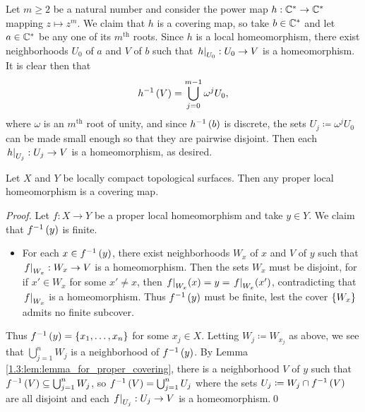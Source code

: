 \documentclass[../Moduli_Spaces_of_Riemann_Surfaces.tex]{subfiles}
\begin{document}
    \begin{example}\label{1.3:exa:covering_map_power}
        Let $m\geq2$ be a natural number and consider the power map $h:\mathbb{C}^\ast\to\mathbb{C}^\ast$ mapping $z\mapsto z^m$. We claim that $h$ is a covering map, so take $b\in\mathbb{C}^\ast$ and let $a\in\mathbb{C}^\ast$ be any one of its $m^\textrm{th}$ roots. Since $h$ is a local homeomorphism, there exist neighborhoods $U_0$ of $a$ and $V$ of $b$ such that $\left.h\right|_{U_0}:U_0\to V$ is a homeomorphism. It is clear then that
        \vspace{-0.05in}
        \begin{equation*}
            h^{-1}\left(V\right)=\bigcup_{j=0}^{m-1}\omega^jU_0,
        \end{equation*}
        where $\omega$ is an $m^\textrm{th}$ root of unity, and since $h^{-1}\left(b\right)$ is discrete, the sets $U_j\coloneqq\omega^jU_0$ can be made small enough so that they are pairwise disjoint. Then each $\left.h\right|_{U_j}:U_j\to V$ is a homeomorphism, as desired.\exqed
    \end{example}
    \begin{proposition}
        Let $X$ and $Y$ be locally compact topological surfaces. Then any proper local homeomorphism is a covering map.
    \end{proposition}
    \begin{proof}
        Let $f:X\to Y$ be a proper local homeomorphism and take $y\in Y$. We claim that $f^{-1}\left(y\right)$ is finite.
        \begin{itemize}
            \item For each $x\in f^{-1}\left(y\right)$, there exist neighborhoods $W_x$ of $x$ and $V$ of $y$ such that $\left.f\right|_{W_x}:W_x\to V$ is a homeomorphism. Then the sets $W_x$ must be disjoint, for if $x'\in W_x$ for some $x'\neq x$, then $\left.f\right|_{W_x}\!\left(x\right)=y=\left.f\right|_{W_x}\!\left(x'\right)$, contradicting that $\left.f\right|_{W_x}$ is a homeomorphism. Thus $f^{-1}\left(y\right)$ must be finite, lest the cover $\left\{W_x\right\}$ admits no finite subcover.
        \end{itemize}
        Thus $f^{-1}\left(y\right)=\left\{x_1,\dots,x_n\right\}$ for some $x_j\in X$. Letting $W_j\coloneqq W_{x_j}$ as above, we see that $\bigcup_{j=1}^{n}W_j$ is a neighborhood of $f^{-1}\left(y\right)$. By Lemma \ref{1.3:lem:lemma_for_proper_covering}, there is a neighborhood $V$ of $y$ such that $f^{-1}\left(V\right)\subseteq\bigcup_{j=1}^{n}W_j$, so $f^{-1}\left(V\right)=\bigcup_{j=1}^{n}U_j$ where the sets $U_j\coloneqq W_j\cap f^{-1}\left(V\right)$ are all disjoint and each $\left.f\right|_{U_j}:U_j\to V$ is a homeomorphism.\qed
    \end{proof}
\end{document}

